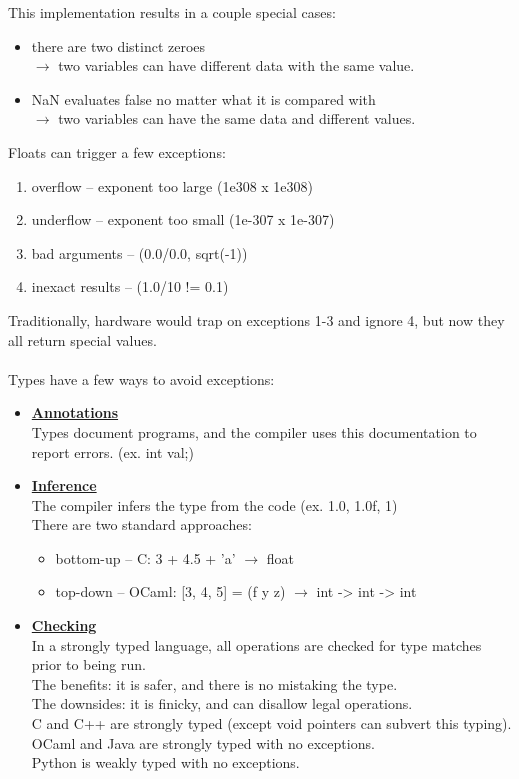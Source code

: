 \documentclass[../../lecture_notes.tex]{subfiles}
\begin{document}
This implementation results in a couple special cases:
\begin{itemize} [itemsep=0mm]
	\item there are two distinct zeroes\\
		$\rightarrow$  two variables can have different data with the same value.
	\item NaN evaluates false no matter what it is compared with\\
		$\rightarrow$ two variables can have the same data and different values.
\end{itemize}
Floats can trigger a few exceptions:
\begin{enumerate} [itemsep=0mm]
	\item overflow -- exponent too large (1e308 x 1e308)
	\item underflow -- exponent too small (1e-307 x 1e-307)
	\item bad arguments -- (0.0/0.0, sqrt(-1))
	\item inexact results -- (1.0/10 != 0.1)
\end{enumerate}
Traditionally, hardware would trap on exceptions 1-3 and ignore 4, but now they all return special values.\\
\\
Types have a few ways to avoid exceptions:
\begin{itemize} [itemsep=0mm]
	\item \textbf{\underline{Annotations}}\\
		Types document programs, and the compiler uses this documentation to report errors. (ex. int val;)\\
	\item \textbf{\underline{Inference}}\\
		The compiler infers the type from the code (ex. 1.0, 1.0f, 1)\\
		There are two standard approaches:
		\begin{itemize} [itemsep=0mm]
			\item bottom-up -- C: 3 + 4.5 + 'a' $\rightarrow$ float
			\item top-down -- OCaml: [3, 4, 5] = (f y z) $\rightarrow$ int -> int -> int
		\end{itemize}
	\item \textbf{\underline{Checking}}\\
		In a strongly typed language, all operations are checked for type matches prior to being run.\\
		The benefits: it is safer, and there is no mistaking the type.\\
		The downsides: it is finicky, and can disallow legal operations.\\
		C and C++ are strongly typed (except void pointers can subvert this typing).\\
		OCaml and Java are strongly typed with no exceptions.\\
		Python is weakly typed with no exceptions.
\end{itemize} 
\end{document}
